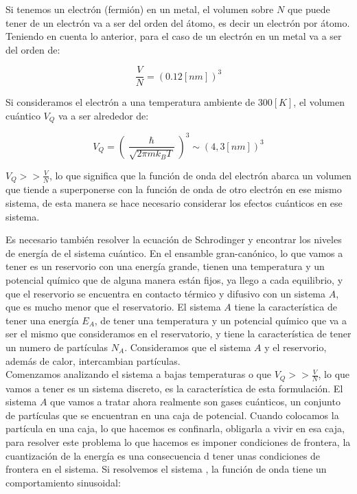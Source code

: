 \documentclass[11pt,fleqn]{book}
\begin{document}
\begin{example}

Si tenemos un electrón (fermión) en un metal, el volumen sobre $N$ que puede tener de un electrón va a ser del orden del átomo, es decir un electrón por átomo. Teniendo en cuenta lo anterior, para el caso de un electrón en un metal va a ser del orden de:

\begin{equation*}
    \frac{V}{N}=(0.12[nm])^{3}
\end{equation*}
 
Si consideramos el electrón a una temperatura ambiente de $300[K]$, el volumen cuántico $V_{Q}$ va a ser alrededor de:

\begin{equation*}
    V_{Q}=\left( \frac{\hslash}{\sqrt{2\pi mk_{B}T}}\right)^{3}\sim(4,3[nm])^{3}
\end{equation*}

$V_{Q}>>\frac{V}{N}$, lo que significa que la función de onda del electrón abarca un volumen que tiende a superponerse con la función de onda de otro electrón en ese mismo sistema, de esta manera se hace necesario considerar los efectos cuánticos en ese sistema.
\end{example}

Es necesario también resolver la ecuación de Schrodinger y encontrar los niveles de energía de el sistema cuántico. En el ensamble gran-canónico, lo que vamos a tener es un reservorio con una energía grande, tienen una temperatura y un potencial químico que de alguna manera están fijos, ya llego a cada equilibrio, y que el reservorio se encuentra en contacto térmico y difusivo con un sistema $A$, que es mucho menor que el reservatorio. El sistema $A$ tiene la característica de tener una energía $E_{A}$, de tener una temperatura y un potencial químico que va a ser el mismo que consideramos en el reservatorio, y tiene la característica de tener un numero de partículas $N_{A}$. Consideramos que el sistema $A$ y el reservorio, además de calor, intercambian partículas.\\


Comenzamos analizando el sistema a bajas temperaturas o que $V_{Q}>>\frac{V}{N}$, lo que vamos a tener es un sistema discreto, es la característica de esta formulación. El sistema $A$ que vamos a tratar ahora realmente son gases cuánticos, un conjunto de partículas que se encuentran en una caja de potencial. Cuando colocamos la partícula en una caja, lo que hacemos es confinarla, obligarla a vivir en esa caja, para resolver este problema lo que hacemos es imponer condiciones de frontera, la cuantización de la energía es una consecuencia d tener unas condiciones de frontera en el sistema. Si resolvemos el sistema , la función de onda tiene un comportamiento sinusoidal:
\end{document}
